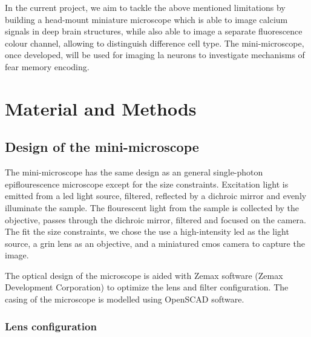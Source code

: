     In the current project, we aim to tackle the above mentioned limitations by building a head-mount miniature microscope which is able to image calcium signals in deep brain structures, while also able to image a separate fluorescence colour channel, allowing to distinguish difference cell type. The mini-microscope, once developed, will be used for imaging \gls{la} neurons to investigate mechanisms of fear memory encoding.


\section{Material and Methods}

\subsection{Design of the mini-microscope}

The mini-microscope has the same design as an general single-photon epiflourescence microscope except for the size constraints. Excitation light is emitted from a \gls{led} light source, filtered, reflected by a dichroic mirror and evenly illuminate the sample. The flourescent light from the sample is collected by the objective, passes through the dichroic mirror, filtered and focused on the camera. The fit the size constraints, we chose the use a high-intensity \gls{led} as the light source, a \gls{grin} lens as an objective, and a miniatured \gls{cmos} camera to capture the image.

The optical design of the microscope is aided with Zemax software (Zemax Development Corporation) to optimize the lens and filter configuration. The casing of the microscope is modelled using OpenSCAD software. 

\subsubsection{Lens configuration}

